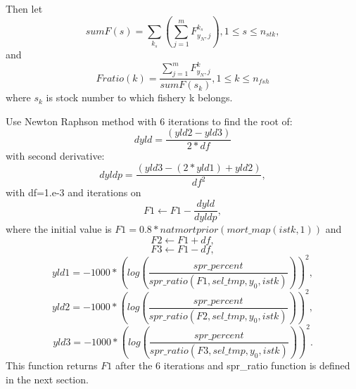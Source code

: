 \documentclass{article}
\begin{document}
Then let
\begin{equation}
    sumF(s)=\sum_{k_s}\left(\sum_{j=1}^mF^{k_s}_{y_N,j}\right), 1\leq s  \leq n_{stk},
\end{equation}
and
\begin{equation}
    Fratio(k)=\dfrac{\sum_{j=1}^m F^k_{y_N,j}}{sumF(s_k)}, 1 \leq k \leq n_{fsh}
\end{equation}
where $s_k$ is stock number to which fishery k belongs.


Use Newton Raphson method with 6 iterations to find the root of:
\begin{equation}
    dyld=\dfrac{(yld2-yld3)}{2*df}
\end{equation}
with second derivative:
\begin{equation}
    dyldp=\dfrac{(yld3-(2*yld1)+yld2)}{df^2},
\end{equation}
with df=1.e-3 and
iterations on
\begin{equation*}
    F1\leftarrow F1-\dfrac{dyld}{dyldp},
\end{equation*}
where the initial value is $F1=0.8*natmortprior(mort\_map(istk,1))$ and
\begin{equation*}
    F2\leftarrow F1+df,
\end{equation*}
\begin{equation*}
    F3 \leftarrow F1-df,
\end{equation*}
\begin{equation*}
    yld1=-1000*\left(log\left(\dfrac{spr\_percent}{spr\_ratio(F1, sel\_tmp,y_0,istk)}\right)\right)^2,
\end{equation*}
\begin{equation*}
    yld2   = -1000*\left(log\left(\dfrac{spr\_percent}{spr\_ratio(F2, sel\_tmp,y_0,istk)}\right)\right)^2,
\end{equation*}
\begin{equation*}
    yld3= -1000*\left(log\left(\dfrac{spr\_percent}{spr\_ratio(F3, sel\_tmp,y_0,istk)}\right)\right)^2.
\end{equation*}
This function returns $F1$ after the 6 iterations and spr\_ratio function is defined in the next section.
\end{document}
